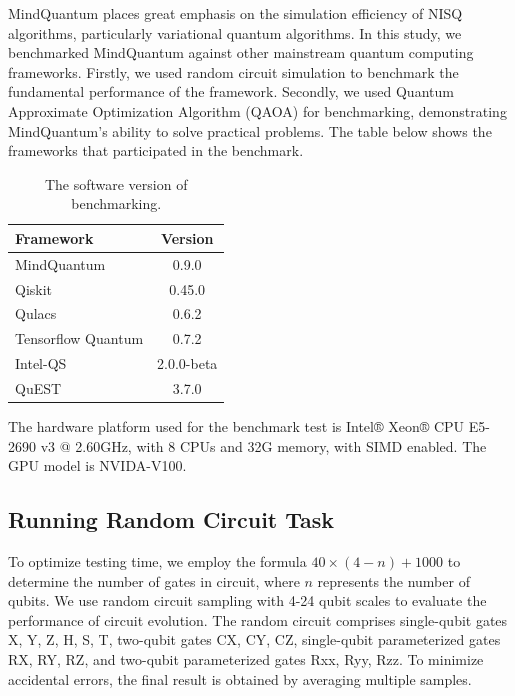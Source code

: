 MindQuantum places great emphasis on the simulation efficiency of NISQ algorithms, particularly variational quantum algorithms. In this study, we benchmarked MindQuantum against other mainstream quantum computing frameworks. Firstly, we used random circuit simulation to benchmark the fundamental performance of the framework. Secondly, we used Quantum Approximate Optimization Algorithm (QAOA) for benchmarking, demonstrating MindQuantum’s ability to solve practical problems. The table below shows the frameworks that participated in the benchmark.

\begin{table}[h!]\centering
\begin{minipage}{\columnwidth}
        \begin{tabularx}{0.9\textwidth}{X c}\toprule
            \textbf{Framework} & \textbf{Version}\\
            \hline
            MindQuantum & 0.9.0\\
            Qiskit & 0.45.0\\
            Qulacs & 0.6.2\\
            Tensorflow Quantum & 0.7.2\\
            Intel-QS & 2.0.0-beta\\
            QuEST & 3.7.0\\
            \bottomrule
        \end{tabularx}
    \caption{The software version of benchmarking.}\label{software version}
\end{minipage}
\end{table}

The hardware platform used for the benchmark test is Intel® Xeon® CPU E5-2690 v3 @ 2.60GHz, with 8 CPUs and 32G memory, with SIMD enabled. The GPU model is NVIDA-V100.

\subsection{Running Random Circuit Task}

To optimize testing time, we employ the formula $40 \times (4−n)+1000$ to determine the number of gates in circuit, where $n$ represents the number of qubits. We use random circuit sampling with 4-24 qubit scales to evaluate the performance of circuit evolution. The random circuit comprises single-qubit gates X, Y, Z, H, S, T, two-qubit gates CX, CY, CZ, single-qubit parameterized gates RX, RY, RZ, and two-qubit parameterized gates Rxx, Ryy, Rzz. To minimize accidental errors, the final result is obtained by averaging multiple samples.

